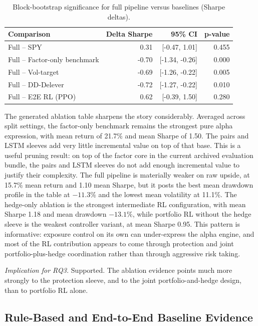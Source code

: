 \documentclass[10pt,twocolumn]{article}
\begin{document}
\begin{table}[t]
\centering
\small
\caption{Block-bootstrap significance for full pipeline versus baselines (Sharpe deltas).}
\label{tab:bootstrap_significance}
\begin{tabular}{@{} l r r r @{}}
\toprule
\textbf{Comparison} & \textbf{Delta Sharpe} & \textbf{95\% CI} & \textbf{p-value} \\
\midrule
Full -- SPY                     & 0.31  & [-0.47, 1.01] & 0.455 \\
Full -- Factor-only benchmark   & -0.70 & [-1.34, -0.26] & 0.000 \\
Full -- Vol-target              & -0.69 & [-1.26, -0.22] & 0.005 \\
Full -- DD-Delever              & -0.72 & [-1.27, -0.22] & 0.010 \\
Full -- E2E RL (PPO)            & 0.62  & [-0.39, 1.50] & 0.280 \\
\bottomrule
\end{tabular}
\end{table}

The generated ablation table sharpens the story considerably. Averaged across
split settings, the factor-only benchmark remains the strongest pure alpha expression, with
mean return of 21.7\% and mean Sharpe of 1.50. The pairs and LSTM sleeves add
very little incremental value on top of that base. This is a useful pruning
result: on top of the factor core in the current archived evaluation bundle,
the pairs and LSTM sleeves do not add enough incremental value to justify their
complexity. The full pipeline is
materially weaker on raw upside, at 15.7\%
mean return and 1.10 mean Sharpe, but it posts the best mean drawdown profile
in the table at $-11.3\%$ and the lowest mean volatility at 11.1\%. The
hedge-only ablation is the strongest intermediate RL configuration, with mean
Sharpe 1.18 and mean drawdown $-13.1\%$, while portfolio RL without the hedge
sleeve is the weakest controller variant, at mean Sharpe 0.95. This pattern is
informative: exposure control on its own can under-express the alpha engine, and
most of the RL contribution appears to come through protection and joint
portfolio-plus-hedge coordination rather than through aggressive risk taking.

\noindent\textit{Implication for RQ3.} Supported. The ablation evidence points
much more strongly to the protection sleeve, and to the joint
portfolio-and-hedge design, than to portfolio RL alone.

\subsection{Rule-Based and End-to-End Baseline Evidence}
\end{document}
